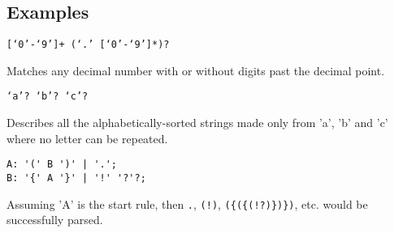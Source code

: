
\subsection{Examples}
{
	\begin{itemize}
	{
		\item \texttt{[`0'-`9']+ (`.' [`0'-`9']*)?}
		
			Matches any decimal number with or without digits
			past the decimal point.
		
		\item \texttt{`a'? `b'? `c'?}
		
			Describes all the alphabetically-sorted strings made only
			from 'a', 'b' and 'c' where no letter can be repeated.
		
		\item
\begin{lstlisting}[texcl = true, language = MAIA]
A: '(' B ')' | '.';
B: '{' A '}' | '!' '?'?;
\end{lstlisting}
			Assuming 'A' is the start rule, then \texttt{.},
			\texttt{(!)}, \texttt{(\{(\{(!?)\})\})}, etc.
			would be successfully parsed.
	}
	\end{itemize}
}
